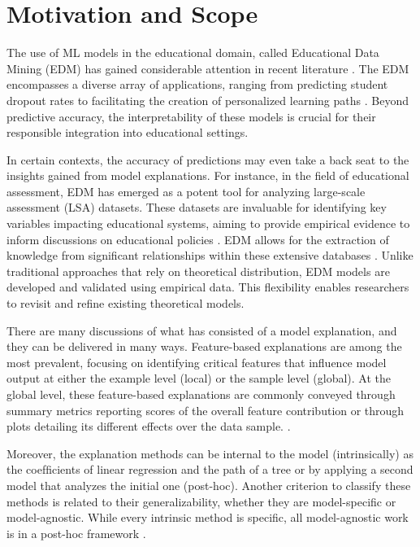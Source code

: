 \section{Motivation and Scope}
\label{motivacao}

The use of ML models in the educational domain, called Educational Data Mining (EDM) has gained considerable attention in recent literature \cite{Romero2020EducationalSurvey}. The EDM encompasses a diverse array of applications, ranging from predicting student dropout rates \cite{Araque2009FactorsRates, Aguiar2015WhoWhy} to facilitating the creation of personalized learning paths \cite{Fancsali2018IntelligentOffs}. Beyond predictive accuracy, the interpretability of these models is crucial for their responsible integration into educational settings.

In certain contexts, the accuracy of predictions may even take a back seat to the insights gained from model explanations. For instance, in the field of educational assessment, EDM has emerged as a potent tool for analyzing large-scale assessment (LSA) datasets. These datasets are invaluable for identifying key variables impacting educational systems, aiming to provide empirical evidence to inform discussions on educational policies  \cite{Hernandez-Torrano2021ModernLiteratureb}.  EDM allows for the extraction of knowledge from significant relationships within these extensive databases \cite{Gamazo2020AnTechniques}. Unlike traditional approaches that rely on theoretical distribution, EDM models are developed and validated using empirical data. This flexibility enables researchers to revisit and refine existing theoretical models\cite{Huang2003InstitutePolicymakers}.

There are many discussions of what has consisted of a model explanation, and they can be delivered in many ways.  Feature-based explanations are among the most prevalent, focusing on identifying critical features that influence model output at either the example level (local) or the sample level (global). At the global level, these feature-based explanations are commonly conveyed through summary metrics reporting scores of the overall feature contribution or through plots detailing its different effects over the data sample. \cite{SilvaFilho2023AAchievement}.

Moreover, the explanation methods can be internal to the model (intrinsically) as the coefﬁcients of linear regression and the path of a tree or by applying a second model that analyzes the initial one (post-hoc). Another criterion to classify these methods is related to their generalizability, whether they are model-speciﬁc or model-agnostic. While every intrinsic method is speciﬁc, all model-agnostic work is in a post-hoc framework \cite{SilvaFilho2021InterpretingEffects}.

